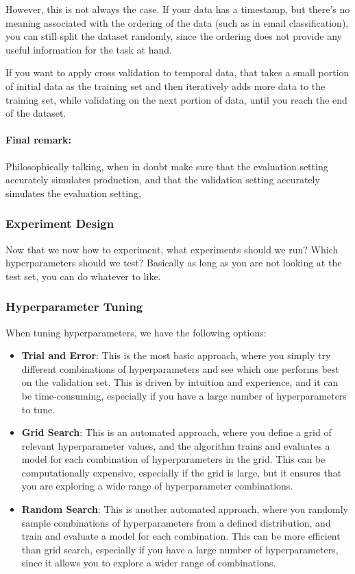 However, this is not always the case. If your data has a timestamp, but there's no meaning
associated with the ordering of the data (such as in email classification), you can still split the dataset randomly, since the ordering does not provide any useful information for the task at hand.

If you want to apply cross validation to temporal data, that takes a small portion of initial data as the training set and then iteratively adds more data to the training set, while validating on the next portion of data, until you reach the end of the dataset.

\paragraph{Final remark:}
Philosophically talking, when in doubt make sure that the evaluation setting accurately simulates production, 
and that the validation setting accurately simulates the evaluation setting,

\subsubsection{Experiment Design}
Now that we now how to experiment, what experiments should we run? Which hyperparameters should we test? 
Basically as long as you are not looking at the test set, you can do whatever to like.

\subsubsection*{Hyperparameter Tuning}
When tuning hyperparameters, we have the following options:
\begin{itemize}
    \item \textbf{Trial and Error}: This is the most basic approach, where you simply try different combinations of hyperparameters and see which one performs best on the validation set.
    This is driven by intuition and experience, and it can be time-consuming, especially if you have a large number of hyperparameters to tune.
    \item \textbf{Grid Search}: This is an automated approach, where you define a grid of relevant hyperparameter values, and the algorithm trains and evaluates a model for each combination of hyperparameters in the grid.
    This can be computationally expensive, especially if the grid is large, but it ensures that you are exploring a wide range of hyperparameter combinations.
    \item \textbf{Random Search}: This is another automated approach, where you randomly sample combinations of hyperparameters from a defined distribution, and train and evaluate a model for each combination.
    This can be more efficient than grid search, especially if you have a large number of hyperparameters, since it allows you to explore a wider range of combinations.
\end{itemize}

